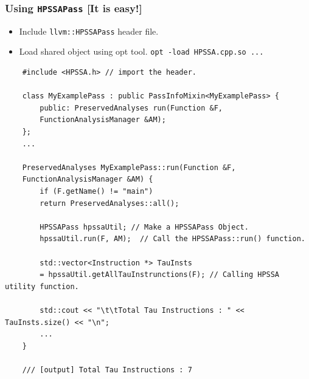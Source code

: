\documentclass[aspectratio=169]{beamer}
\begin{document}
\begin{frame}[fragile]
	\frametitle{Using \texttt{HPSSAPass} [It is easy!]}
	\begin{itemize}
		\item Include \texttt{llvm::HPSSAPass} header file.
		\item Load shared object using opt tool. \texttt{opt -load HPSSA.cpp.so ...} 
	\end{itemize}
	\begin{verbatim}
	#include <HPSSA.h> // import the header.
	
	class MyExamplePass : public PassInfoMixin<MyExamplePass> {
		public: PreservedAnalyses run(Function &F, 
		FunctionAnalysisManager &AM);
	};
	...
	
	PreservedAnalyses MyExamplePass::run(Function &F, 
	FunctionAnalysisManager &AM) {
		if (F.getName() != "main")
		return PreservedAnalyses::all();
		
		HPSSAPass hpssaUtil; // Make a HPSSAPass Object.
		hpssaUtil.run(F, AM);  // Call the HPSSAPass::run() function.
		
		std::vector<Instruction *> TauInsts 
		= hpssaUtil.getAllTauInstrunctions(F); // Calling HPSSA utility function.
		
		std::cout << "\t\tTotal Tau Instructions : " << TauInsts.size() << "\n";
		...
	}
	
	/// [output] Total Tau Instructions : 7 
	\end{verbatim}
\end{frame}
\end{document}
